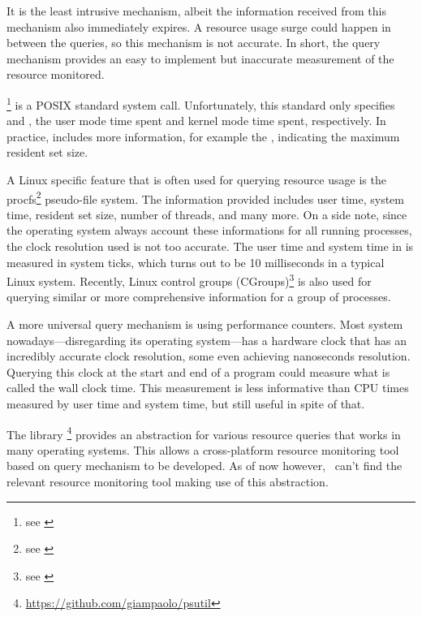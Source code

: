 It is the least intrusive mechanism, albeit the information received from this mechanism also immediately expires.
A resource usage surge could happen in between the queries, so this mechanism is not accurate.
In short, the query mechanism provides an easy to implement but inaccurate measurement of the resource monitored.

\footnote{see \href{https://linux.die.net/man/2/getrusage}{}} is a POSIX standard system call.
Unfortunately, this standard only specifies  and , the user mode time spent and kernel mode time spent, respectively.
In practice,  includes more information, for example the , indicating the maximum resident set size.

A Linux specific feature that is often used for querying resource usage is the procfs\footnote{see \href{https://linux.die.net/man/5/proc}{}} pseudo-file system.
The information provided includes user time, system time, resident set size, number of threads, and many more.
On a side note, since the operating system always account these informations for all running processes, the clock resolution used is not too accurate.
The user time and system time in  is measured in system ticks, which turns out to be 10 milliseconds in a typical Linux system.
Recently, Linux control groups (CGroups)\footnote{see \href{http://man7.org/linux/man-pages/man7/cgroups.7.html}{}} is also used for querying similar or more comprehensive information for a group of processes.

A more universal query mechanism is using performance counters.
Most system nowadays---disregarding its operating system---has a hardware clock that has an incredibly accurate clock resolution, some even achieving nanoseconds resolution.
Querying this clock at the start and end of a program could measure what is called the wall clock time.
This measurement is less informative than CPU times measured by user time and system time, but still useful in spite of that.

The library \footnote{\href{https://github.com/giampaolo/psutil}{https://github.com/giampaolo/psutil}} provides an abstraction for various resource queries that works in many operating systems.
This allows a cross-platform resource monitoring tool based on query mechanism to be developed.
As of now however, \first~can't find the relevant resource monitoring tool making use of this abstraction.

